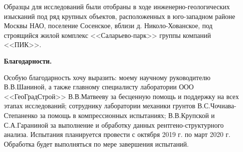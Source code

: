 
Образцы для исследований были отобраны в ходе инженерно-геологических изысканий под ряд крупных объектов, расположенных в юго-западном районе Москвы НАО, поселение Сосенское, вблизи д. Николо-Хованское, под строящийся жилой комплекс <<Саларьево-парк>> группы компаний <<ПИК>>. 
 

\textbf{Благодарности.}

Особую благодарность хочу выразить: моему научному руководителю В.\;В.\;Шаниной, а также главному специалисту лаборатории ООО <<ГеоГрадСтрой>> В.\;В.\;Матвееву за бесценную помощь и поддержку на всех этапах исследований; сотруднику лаборатории механики грунтов В.\;С.\;Чочиава-Степаненко за помощь в компрессионных испытаниях; В.\;В.\;Крупской и С.\;А.\;Гараниной за выполнение и обработку данных рентгено-структурного анализа.
Испытания планируется провести с октября 2019 г. по март 2020 г. Обработка будет выполняться по мере завершения испытаний.